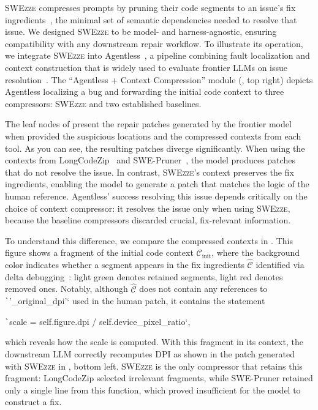 \documentclass[sigconf,nonacm]{acmart}
\newcommand{\projName}{\textsc{SWEzze}\xspace}
\begin{document}
\projName compresses prompts by pruning their code segments to an issue's fix ingredients~\cite{martinez2014fix}, the minimal set of semantic dependencies needed to resolve that issue.
We designed \projName to be model- and harness-agnostic, ensuring compatibility with any downstream repair workflow. 
To illustrate its operation, we integrate \projName into Agentless~\cite{xia2024agentless}, a  pipeline combining fault localization and context construction that is widely used to evaluate frontier LLMs on issue resolution~\cite{deng2025swe}. 
The ``Agentless + Context Compression'' module (, top right) depicts Agentless localizing a bug and forwarding the initial code context to three compressors: \projName and two established baselines.

The leaf nodes of  present the repair patches generated by the frontier model when provided the suspicious locations and the compressed contexts from each tool. As you can see, the resulting patches diverge significantly. When using the contexts from LongCodeZip~\cite{shi2025longcodezip} and SWE-Pruner~\cite{wang2026swe}, the model produces patches that do not resolve the issue. In contrast,  \projName's context preserves the fix ingredients, enabling the model to generate a patch that matches the logic of the human reference. Agentless' success resolving this issue depends critically on the choice of context compressor: it resolves the issue only when using \projName, because the baseline compressors discarded crucial, fix-relevant information.

To understand this difference, we compare the compressed contexts in . This figure shows a fragment of the initial code context $\mathcal{C}_\mathrm{init}$, where the background color indicates whether a segment appears in the fix ingredients $\hat{\mathcal{C}}$ identified via delta debugging~\cite{zeller2002simplifying}: light green denotes retained segments, light red denotes removed ones. Notably, although $\hat{\mathcal{C}}$ does not contain any references to \texttt`'_original_dpi'` used in the human patch, it contains the statement

\texttt`scale = self.figure.dpi / self.device_pixel_ratio`,

\noindent which reveals how the scale is computed. With this fragment in its context, the downstream LLM correctly recomputes DPI as shown in the patch generated with \projName in , bottom left. \projName is the only compressor that retains this fragment: LongCodeZip selected irrelevant fragments, while SWE-Pruner retained only a single line from this function, which proved insufficient for the model to construct a fix.
\end{document}
